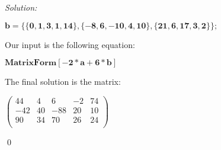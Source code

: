 \documentclass[12pt]{article}
\newenvironment{sol}
    {\emph{Solution:}
    }
    {
    \qed
    }
\begin{document}
\begin{sol}
\begin{doublespace}
\noindent\(\pmb{b=\{\{0,1,3,1,14\},\{-8,6,-10,4,10\},\{21,6,17,3,2\}\};}\)
\end{doublespace}

Our input is the following equation:

\begin{doublespace}
\noindent\(\pmb{\text{MatrixForm}[-2*a+6*b]}\)
\end{doublespace}

The final solution is the matrix:

\begin{doublespace}
\noindent\(\left(
\begin{array}{ccccc}
 44 & 4 & 6 & -2 & 74 \\
 -42 & 40 & -88 & 20 & 10 \\
 90 & 34 & 70 & 26 & 24 \\
\end{array}
\right)\)
\end{doublespace}
\end{sol}
\end{document}
